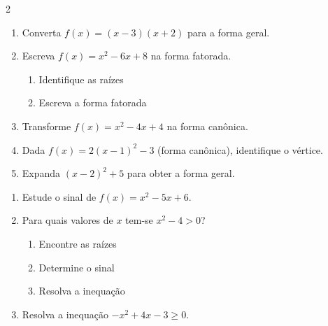 \documentclass[11pt]{article}
\begin{document}
\begin{multicols}{2}
\begin{enumerate}[leftmargin=*, start=6]
\end{enumerate}


\begin{enumerate}[leftmargin=*, start=11]

\item Converta $f(x) = (x - 3)(x + 2)$ para a forma geral.

\item Escreva $f(x) = x^2 - 6x + 8$ na forma fatorada.

\begin{enumerate}[label=\alph*)]
\item Identifique as raízes
\item Escreva a forma fatorada
\end{enumerate}

\item Transforme $f(x) = x^2 - 4x + 4$ na forma canônica.

\item Dada $f(x) = 2(x - 1)^2 - 3$ (forma canônica), identifique o vértice.

\item Expanda $(x - 2)^2 + 5$ para obter a forma geral.

\end{enumerate}


\begin{enumerate}[leftmargin=*, start=16]

\item Estude o sinal de $f(x) = x^2 - 5x + 6$.

\item Para quais valores de $x$ tem-se $x^2 - 4 > 0$?

\begin{enumerate}[label=\alph*)]
\item Encontre as raízes
\item Determine o sinal
\item Resolva a inequação
\end{enumerate}

\item Resolva a inequação $-x^2 + 4x - 3 \geq 0$.


\end{enumerate}
\end{multicols}
\end{document}
